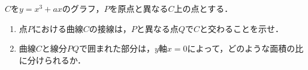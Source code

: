 \documentclass[../../main.tex]{subfiles}
\begin{document}
$C$を$y=x^3+ax$のグラフ，$P$を原点と異なる$C$上の点とする．
\begin{enumerate}
  \item 点$P$における曲線$C$の接線は，$P$と異なる点$Q$で$C$と交わることを示せ．
  \item 曲線$C$と線分$PQ$で囲まれた部分は，$y$軸$x=0$によって，どのような面積の比に分けられるか．
\end{enumerate}
\end{document}
